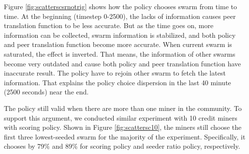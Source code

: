 Figure \ref{fig:scatterscsrnotrig} shows how the policy chooses swarm from time to time. At the beginning (timestep 0-2500), the lacks of information causes peer translation function to be less accurate. But as the time goes on, more information can be collected, swarm information is stabilized, and both policy and peer translation function become more accurate. When current swarm is saturated, the effect is inverted. That means, the information of other swarms become very outdated and cause both policy and peer translation function have inaccurate result. The policy have to rejoin other swarm to fetch the latest information. That explains the policy choice dispersion in the last 40 minute (2500 seconds) near the end. 

The policy still valid when there are more than one miner in the community. To support this argument, we conducted similar experiment with 10 credit miners with scoring policy. Shown in Figure \ref{fig:scattersc10}, the miners still choose the first three lowest-seeded swarm for the majority of the experiment. Specifically, it chooses by 79\% and 89\% for scoring policy and seeder ratio policy, respectively. 


